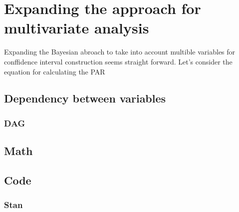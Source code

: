 \chapter{Expanding the approach for multivariate analysis} \label{Expanding}
Expanding the Bayesian abroach to take into account multible variables for conffidence interval construction seems straight forward. Let's consider the equation for calculating the PAR 

\section{Dependency between variables}
\subsection{DAG}\label{DAG}
\section{Math}\label{Math}
\section{Code}\label{Code}
\subsection{Stan}\label{codeInStan}